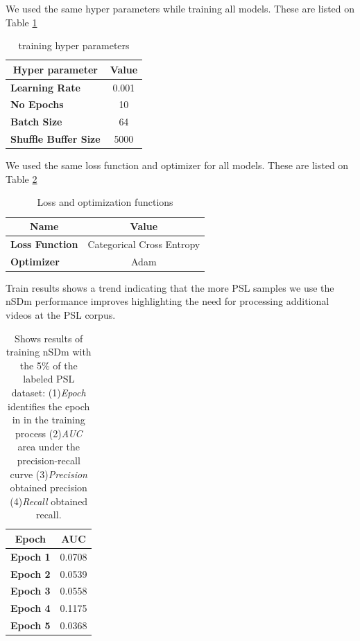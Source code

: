 \documentclass[twocolumn,conference]{article}
\begin{document}
We used the same hyper parameters while training all models. These are listed on Table \ref{tab:training-hyperparams}

\begin{table}[!htb]
\captionsetup{size=footnotesize}
\begin{tabular}{ p{16em} c}
\toprule
\multicolumn{1}{c}{\textbf{Hyper parameter}} & 
	\multicolumn{1}{c}{\textbf{Value}}\\
\midrule
\textbf{Learning Rate}&	0.001\\
\textbf{No Epochs}&	10\\
\textbf{Batch Size}&	64\\
\textbf{Shuffle Buffer Size}&	5000\\
\bottomrule
\end{tabular}
\caption{training hyper parameters} \label{tab:training-hyperparams}
\end{table}

We used the same loss function and optimizer for all models. These are listed on Table \ref{tab:training-loss-optimizer}

\begin{table}[!htb]
\captionsetup{size=footnotesize}
\begin{tabular}{ p{10em} c}
\toprule
\multicolumn{1}{c}{\textbf{Name}} & 
	\multicolumn{1}{c}{\textbf{Value}}\\
\midrule
\textbf{Loss Function}&	Categorical Cross Entropy\\
\textbf{Optimizer}&	Adam\\
\bottomrule
\end{tabular}
\caption{Loss and optimization functions} \label{tab:training-loss-optimizer}
\end{table}

Train results shows a trend indicating that the more PSL samples we use the nSDm performance improves highlighting the need for processing additional videos at the PSL corpus.
\begin{table}[!htb]
\captionsetup{font=footnotesize}
\centering
\begin{tabular}{ p{16em} c }
\toprule
\multicolumn{1}{c}{\textbf{Epoch}} & 
	\multicolumn{1}{c}{\textbf{AUC}}\\
\midrule
\textbf{Epoch 1}&	0.0708\\
\textbf{Epoch 2}&	0.0539\\
\textbf{Epoch 3}&	0.0558\\
\textbf{Epoch 4}&	0.1175\\
\textbf{Epoch 5}&	0.0368\\
\bottomrule
\end{tabular}
\caption{Shows results of training nSDm with the 5\% of the labeled PSL dataset: (1)\textit{Epoch} identifies the epoch in in the training process (2)\textit{AUC} area under the precision-recall curve (3)\textit{Precision} obtained precision (4)\textit{Recall} obtained recall.}
\label{tab:signs-detection-results-5-percent}
\end{table}
\end{document}
